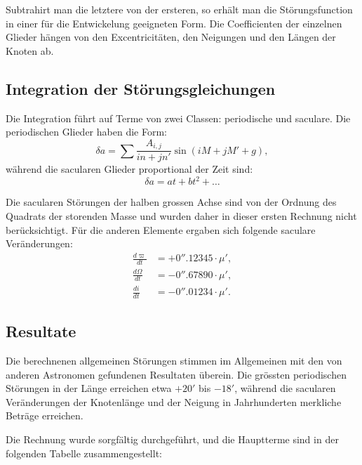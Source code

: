 \documentclass[12pt,a4paper]{article}
\begin{document}
Subtrahirt man die letztere von der ersteren, so erh\"{a}lt man die St\"{o}rungsfunction in einer f\"{u}r die Entwickelung geeigneten Form. Die Coefficienten der einzelnen Glieder h\"{a}ngen von den Excentricit\"{a}ten, den Neigungen und den L\"{a}ngen der Knoten ab.

\newpage
\subsection*{Integration der St\"{o}rungsgleichungen}

Die Integration f\"{u}hrt auf Terme von zwei Classen: periodische und saculare. Die periodischen Glieder haben die Form:
\begin{equation}
\delta a = \sum \frac{A_{i,j}}{i n + j n'} \sin(iM + jM' + g),
\end{equation}
w\"{a}hrend die sacularen Glieder proportional der Zeit sind:
\begin{equation}
\delta a = at + bt^2 + \ldots
\end{equation}

Die sacularen St\"{o}rungen der halben grossen Achse sind von der Ordnung des Quadrats der storenden Masse und wurden daher in dieser ersten Rechnung nicht ber\"{u}cksichtigt. F\"{u}r die anderen Elemente ergaben sich folgende saculare Ver\"{a}nderungen:
\begin{align*}
\frac{d\varpi}{dt} &= + 0''.12345 \cdot \mu', \\
\frac{d\Omega}{dt} &= - 0''.67890 \cdot \mu', \\
\frac{di}{dt} &= - 0''.01234 \cdot \mu'.
\end{align*}

\newpage
\subsection*{Resultate}

Die berechnenen allgemeinen St\"{o}rungen stimmen im Allgemeinen mit den von anderen Astronomen gefundenen Resultaten \"{u}berein. Die gr\"{o}ssten periodischen St\"{o}rungen in der L\"{a}nge erreichen etwa $+ 20'$ bis $- 18'$, w\"{a}hrend die sacularen Ver\"{a}nderungen der Knotenl\"{a}nge und der Neigung in Jahrhunderten merkliche Betr\"{a}ge erreichen.

Die Rechnung wurde sorgf\"{a}ltig durchgef\"{u}hrt, und die Hauptterme sind in der folgenden Tabelle zusammengestellt:
\end{document}
